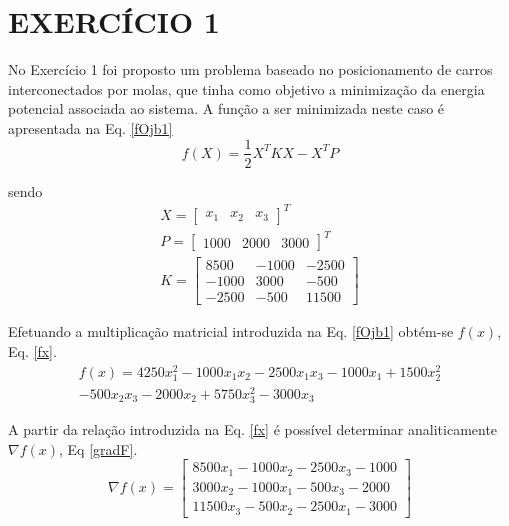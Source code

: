 \documentclass[12pt]{article}
\begin{document}
	\section*{EXERCÍCIO 1}
		No Exercício 1 foi proposto um problema baseado no posicionamento de carros interconectados por molas, que tinha como objetivo a minimização da energia potencial associada ao sistema. A função a ser minimizada neste caso é apresentada na Eq. \ref{fOjb1}
		\begin{equation}
			f(X) = \frac{1}{2}X^TKX - X^TP
			\label{fOjb1}
		\end{equation}
		
		\noindent sendo
		\begin{gather}
			X = \left[ \begin{array}{ccc} x_1 & x_2 & x_3 \end{array} \right]^T \\
			P = \left[ \begin{array}{ccc} 1000 & 2000 & 3000 \end{array} \right]^T \\
			K = \left[ \begin{array}{ccc} 8500 & -1000 & -2500 \\ -1000 & 3000 & -500 \\ -2500 & -500 & 11500 \end{array} \right]
		\end{gather}                                  
		
		Efetuando a multiplicação matricial introduzida na Eq. \ref{fOjb1} obtém-se $ f(x) $, Eq. \ref{fx}.
		\begin{equation}
			\begin{split}
				f(x) = 4250x_1^2 - 1000 x_1 x_2 - 2500 x_1 x_3 - 1000 x_1 + 1500 x_2^2 \\
				- 500 x_2 x_3 - 2000 x_2 + 5750 x_3^2 - 3000 x_3 \label{fx}
			\end{split}
		\end{equation}
		
		A partir da relação introduzida na Eq. \ref{fx} é possível determinar analiticamente $ \nabla f(x) $, Eq \ref{gradF}.
		\begin{equation}
			\nabla f(x) = \left[ \begin{array}{ccc}
			8500 x_1 - 1000 x_2 - 2500 x_3 - 1000 \\
			3000 x_2 - 1000 x_1 -500 x_3 - 2000 \\
			11500 x_3 - 500 x_2 - 2500 x_1 - 3000
			\end{array} \right]
			\label{gradF}
		\end{equation} 
		
\end{document}
